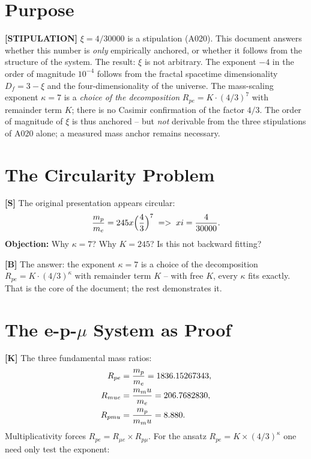 \section{Purpose}

\textbf{[STIPULATION]} $\xi = 4/30000$ is a stipulation (A020). This document
answers whether this number is \emph{only} empirically anchored, or whether it
follows from the structure of the system. The result: $\xi$ is not arbitrary.
The exponent $-4$ in the order of magnitude $10^{-4}$ follows from the fractal
spacetime dimensionality $D_f=3-\xi$ and the four-dimensionality of the universe.
The mass-scaling exponent $\kappa=7$ is a \emph{choice of the decomposition}
$R_{pe} = K\cdot(4/3)^7$ with remainder term $K$; there is no Casimir
confirmation of the factor $4/3$.
The order of magnitude of $\xi$ is thus anchored -- but \emph{not} derivable from the three stipulations of A020
alone; a measured mass anchor remains necessary.

\section{The Circularity Problem}

\textbf{[S]} The original presentation appears circular:
\[
  \frac{m_p}{m_e} = 245\times\Bigl(\frac43\Bigr)^7
  \;\Rightarrow\; \xi = \frac{4}{30000}.
\]
\textbf{Objection:} Why $\kappa=7$? Why $K=245$? Is this not backward fitting?

\textbf{[B]} The answer: the exponent $\kappa=7$ is a choice of the decomposition
$R_{pe} = K\cdot(4/3)^\kappa$ with remainder term $K$ -- with free $K$, every $\kappa$ fits exactly.
That is the core of the document; the rest demonstrates it.

\section{The e-p-$\mu$ System as Proof}

\textbf{[K]} The three fundamental mass ratios:
\begin{align}
  R_{pe}    &= \frac{m_p}{m_e}   = 1836{.}15267343, \notag\\
  R_{\mu e} &= \frac{m_\mu}{m_e} = 206{.}7682830, \notag\\
  R_{p\mu}  &= \frac{m_p}{m_\mu} = 8{.}880. \notag
\end{align}
Multiplicativity forces $R_{pe} = R_{\mu e}\times R_{p\mu}$. For the ansatz
$R_{pe} = K\times(4/3)^\kappa$ one need only test the exponent:

